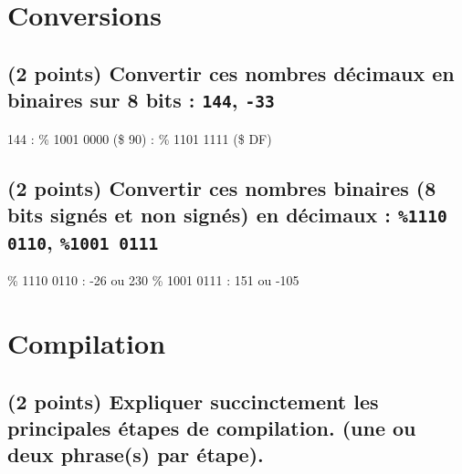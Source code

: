 \documentclass[11pt,a4paper]{article}
\author{Fabrice BOISSIER}
\begin{document}
\setlength{\fboxrule}{2pt}

\noindent {}



%


\section{Conversions} %

\subsection{(2 points) Convertir ces nombres décimaux en binaires sur 8 bits : \texttt{144}, \texttt{-33}}

\bigskip

144 : \% 1001 0000 (\$ 90)	 : \% 1101 1111 (\$ DF)

\bigskip

\subsection{(2 points) Convertir ces nombres binaires (8 bits signés et non signés) en décimaux : \texttt{\%1110 0110}, \texttt{\%1001 0111}}

\bigskip

\% 1110 0110 : -26 ou 230	\qquad	\% 1001 0111 : 151 ou -105

\bigskip

\section{Compilation} %

\subsection{(2 points) Expliquer succinctement les principales étapes de compilation. (une ou deux phrase(s) par étape).}
\end{document}
